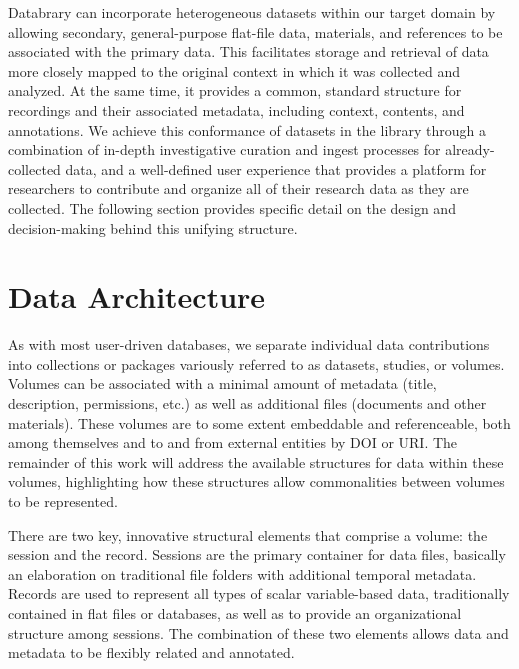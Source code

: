\documentclass{sig-alternate}
\begin{document}
Databrary can incorporate heterogeneous datasets within our target domain by allowing secondary, general-purpose flat-file data, materials, and references to be associated with the primary data.
This facilitates storage and retrieval of data more closely mapped to the original context in which it was collected and analyzed.
At the same time, it provides a common, standard structure for recordings and their associated metadata, including context, contents, and annotations.
We achieve this conformance of datasets in the library through a combination of in-depth investigative curation and ingest processes for already-collected data, and a well-defined user experience that provides a platform for researchers to contribute and organize all of their research data as they are collected.
The following section provides specific detail on the design and decision-making behind this unifying structure.

\section{Data Architecture}


As with most user-driven databases, we separate individual data contributions into collections or packages variously referred to as datasets, studies, or volumes.
Volumes can be associated with a minimal amount of metadata (title, description, permissions, etc.) as well as additional files (documents and other materials).
These volumes are to some extent embeddable and referenceable, both among themselves and to and from external entities by DOI or URI.
The remainder of this work will address the available structures for data within these volumes, highlighting how these structures allow commonalities between volumes to be represented.


There are two key, innovative structural elements that comprise a volume: the session and the record.
Sessions are the primary container for data files, basically an elaboration on traditional file folders with additional temporal metadata.
Records are used to represent all types of scalar variable-based data, traditionally contained in flat files or databases, as well as to provide an organizational structure among sessions.
The combination of these two elements allows data and metadata to be flexibly related and annotated.
\end{document}
